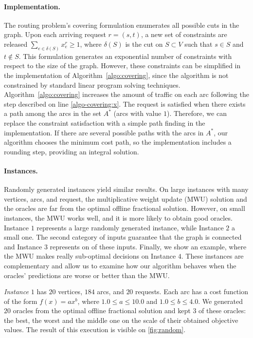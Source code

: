 \paragraph{Implementation.}
The routing problem's covering formulation enumerates all possible cuts in the graph. Upon each arriving request $r = (s,t)$, a new set of constraints are released $\sum_{e \in \delta(S)} x_{e}^{r} \ge 1$, where $\delta(S)$ is the cut on $S \subset V$ such that $s \in S$ and $t \notin S$. This formulation generates an exponential number of constraints with respect to the size of the graph. However, these constraints can be simplified in the implementation of Algorithm~\ref{algo:covering}, since the algorithm is not constrained by standard linear program solving techniques. Algorithm~\ref{algo:covering} increases the amount of traffic on each arc following the step described on line \ref{algo-covering:x}. The request is satisfied when there exists a path among the arcs in the set $A^{*}$ (arcs with value $1$). Therefore, we can replace the constraint satisfaction with a simple path finding in the implementation. If there are several possible paths with the arcs in $A^{*}$, our algorithm chooses the minimum cost path, so the implementation includes a rounding step, providing an integral solution.


\paragraph{Instances.} Randomly generated instances yield similar results. On large instances with many vertices, arcs, and request, the multiplicative weight update (MWU) solution and the oracles are far from the optimal offline fractional solution. However, on small instances, the MWU works well, and it is more likely to obtain good oracles. Instance $1$ represents a large randomly generated instance, while Instance $2$ a small one. The second category of inputs guarantee that the graph is connected and Instance $3$ represents on of these inputs. Finally, we show an example, where the MWU makes really sub-optimal decisions on Instance $4$. These instances are complementary and allow us to examine how our algorithm behaves when the oracles' predictions are worse or better than the MWU.

\textit{Instance $1$} has $20$ vertices, $184$ arcs, and $20$ requests. Each arc has a cost function of the form $f(x) = a x^b$, where $1.0 \le a \le 10.0$ and $1.0 \le b \le 4.0$. We generated $20$ oracles from the optimal offline fractional solution and kept $3$ of these oracles: the best, the worst and the middle one on the scale of their obtained objective values. The result of this execution is visible on \cref{fig:random}.

